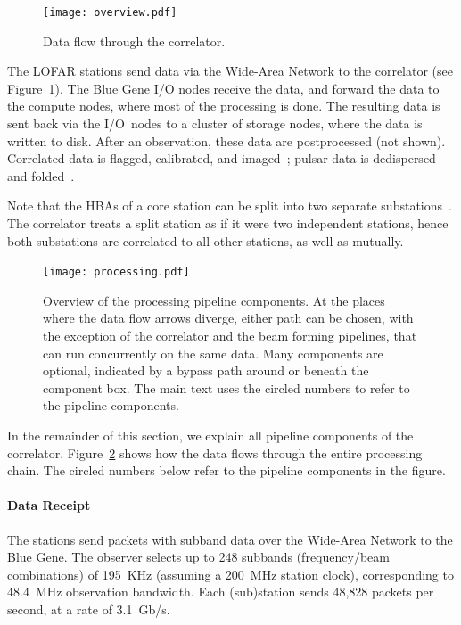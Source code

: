 \begin{figure}
\vspace{-9mm}
\begin{center}
\texttt{[image: overview.pdf]}
\end{center}
\caption{Data flow through the correlator.}
\vspace{-5mm}
\label{fig:overview}
\end{figure}
The LOFAR stations send data via the Wide-Area Network to the correlator
(see Figure~\ref{fig:overview}).
The Blue Gene I/O nodes receive the data, and forward the data to the
compute nodes, where most of the processing is done.
The resulting data is sent back via the I/O~nodes to a cluster of storage
nodes, where the data is written to disk.
After an observation, these data are postprocessed (not shown).
Correlated data is flagged, calibrated, and imaged~\cite{Nijboer:10};
pulsar data is dedispersed and folded~\cite{Hessels:10}.

Note that the HBAs of a core station can be split into two separate
substations~\cite{?}.
The correlator treats a split station as if it were two independent stations,
hence both substations are correlated to all other stations, as well as
mutually.

\begin{figure}
\begin{center}
\texttt{[image: processing.pdf]}
\end{center}
\caption{Overview of the processing pipeline components.
At the places where the data flow arrows diverge, either path can be chosen,
with the exception of the correlator and the beam forming pipelines, that can
run concurrently on the same data.
Many components are optional, indicated by a bypass path around or beneath the
component box.
The main text uses the circled numbers to refer to the pipeline components.
}
\label{fig:processing}
\end{figure}

In the remainder of this section, we explain all pipeline components of
the correlator.
Figure~\ref{fig:processing} shows how the data flows through the entire
processing chain.
The circled numbers below refer to the pipeline components in the figure.


\paragraph{Data Receipt }
The stations send packets with subband data over the Wide-Area Network to the
Blue Gene.
The observer selects up to 248 subbands (frequency/beam combinations) of
195~KHz (assuming a 200~MHz station clock), corresponding to 48.4~MHz
observation bandwidth.
Each (sub)station sends 48,828 packets per second, at a rate of 3.1~Gb/s.

